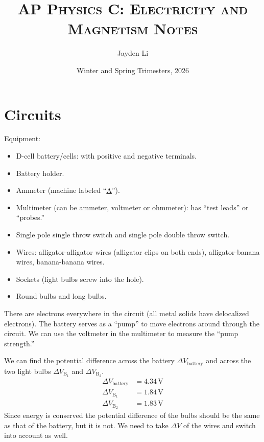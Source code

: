\documentclass{article}
\title{\vspace*{-40pt}\textsc{AP Physics C: Electricity and Magnetism Notes}}
\author{Jayden Li}
\date{Winter and Spring Trimesters, 2026}
\begin{document}
\fontsize{11pt}{12pt}\selectfont
\setlength{\abovedisplayskip}{\abovedisplayskip/2}
\setlength{\belowdisplayskip}{\belowdisplayskip/2}
\setlength{\parindent}{0pt}
\setlength{\parskip}{2ex plus 0.5ex minus 0.2ex}
\maketitle

\tableofcontents

\section{Circuits}

Equipment:
\begin{itemize}
	\item D-cell battery/cells: with positive and negative terminals.
	\item Battery holder.
	\item Ammeter (machine labeled ``\ul{A}'').
	\item Multimeter (can be ammeter, voltmeter or ohmmeter): has ``test leads'' or ``probes.''
	\item Single pole single throw switch and single pole double throw switch.
	\item Wires: alligator-alligator wires (alligator clips on both ends), alligator-banana wires, banana-banana wires.
	\item Sockets (light bulbs screw into the hole).
	\item Round bulbs and long bulbs.
\end{itemize}

There are electrons everywhere in the circuit (all metal solids have delocalized electrons). The battery serves as a ``pump'' to move electrons around through the circuit. We can use the voltmeter in the multimeter to measure the ``pump strength.'' 

We can find the potential difference across the battery $\Delta V_\text{battery}$ and across the two light bulbs $\Delta V_{\text{B}_1}$ and $\Delta V_{\text{B}_2}$.
\begin{align*}
	\Delta V_\text{battery}&=4.34\,\si{\volt} \\
	\Delta V_{\text{B}_1}&=1.84\,\si{\volt} \\
	\Delta V_{\text{B}_2}&=1.83\,\si{\volt}
\end{align*}
Since energy is conserved the potential difference of the bulbs should be the same as that of the battery, but it is not. We need to take $\Delta V$ of the wires and switch into account as well. 
\end{document}

